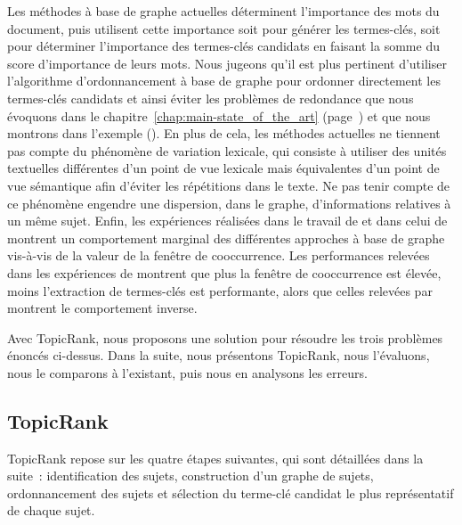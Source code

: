     Les méthodes à base de graphe actuelles déterminent l'importance des mots du
    document, puis utilisent cette importance soit pour générer les termes-clés,
    soit pour déterminer l'importance des termes-clés candidats en faisant la
    somme du score d'importance de leurs mots. Nous jugeons qu'il est plus
    pertinent d'utiliser l'algorithme d'ordonnancement à base de graphe pour
    ordonner directement les termes-clés candidats et ainsi éviter les problèmes
    de redondance que nous évoquons dans le
    chapitre~\ref{chap:main-state_of_the_art}
    (page~\pageref{chap:main-state_of_the_art}) et que nous montrons dans
    l'exemple 
    (). En plus de cela, les méthodes actuelles ne tiennent pas
    compte du phénomène de variation lexicale, qui consiste à utiliser des
    unités textuelles différentes d'un point de vue lexicale mais équivalentes
    d'un point de vue sémantique afin d'éviter les répétitions dans le texte. Ne
    pas tenir compte de ce phénomène engendre une dispersion, dans le graphe,
    d'informations relatives à un même sujet. Enfin, les expériences réalisées
    dans le travail de  et dans celui de
     montrent un comportement marginal des
    différentes approches à base de graphe vis-à-vis de la valeur de la fenêtre
    de cooccurrence. Les performances relevées dans les expériences de
     montrent que plus la fenêtre de cooccurrence
    est élevée, moins l'extraction de termes-clés est performante, alors que
    celles relevées par  montrent le comportement
    inverse. 

    Avec TopicRank, nous proposons une solution pour résoudre les trois
    problèmes énoncés ci-dessus. Dans la suite, nous présentons TopicRank, nous
    l'évaluons, nous le comparons à l'existant, puis nous en analysons les
    erreurs.

    \subsection{TopicRank}
    \label{subsec:main-automatic_keyphrase_annotation-unsupervised_automatic_keyphrase_extraction-topicrank}
      TopicRank repose sur les quatre étapes suivantes, qui sont détaillées dans
      la suite~: identification des sujets, construction d'un graphe de sujets,
      ordonnancement des sujets et sélection du terme-clé candidat le plus
      représentatif de chaque sujet.

